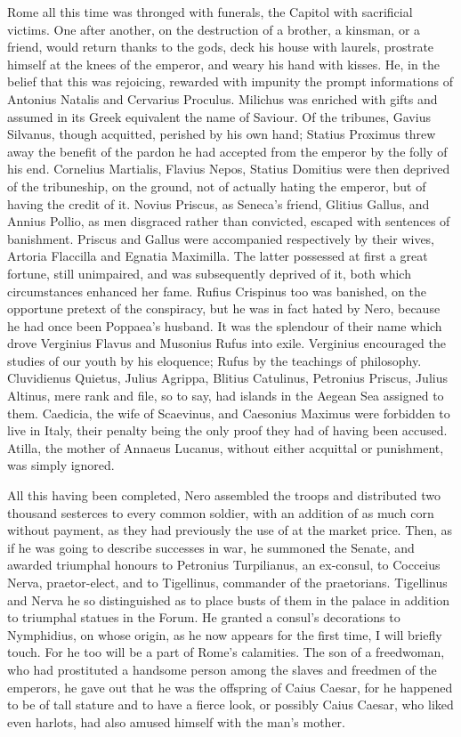 Rome all this time was thronged with funerals, the Capitol with sacrificial victims. One after another, on the destruction of a brother, a kinsman, or a friend, would return thanks to the gods, deck his house with laurels, prostrate himself at the knees of the emperor, and weary his hand with kisses. He, in the belief that this was rejoicing, rewarded with impunity the prompt informations of Antonius Natalis and Cervarius Proculus. Milichus was enriched with gifts and assumed in its Greek equivalent the name of Saviour. Of the tribunes, Gavius Silvanus, though acquitted, perished by his own hand; Statius Proximus threw away the benefit of the pardon he had accepted from the emperor by the folly of his end. Cornelius Martialis, Flavius Nepos, Statius Domitius were then deprived of the tribuneship, on the ground, not of actually hating the emperor, but of having the credit of it. Novius Priscus, as Seneca's friend, Glitius Gallus, and Annius Pollio, as men disgraced rather than convicted, escaped with sentences of banishment. Priscus and Gallus were accompanied respectively by their wives, Artoria Flaccilla and Egnatia Maximilla. The latter possessed at first a great fortune, still unimpaired, and was subsequently deprived of it, both which circumstances enhanced her fame. Rufius Crispinus too was banished, on the opportune pretext of the conspiracy, but he was in fact hated by Nero, because he had once been Poppaea's husband. It was the splendour of their name which drove Verginius Flavus and Musonius Rufus into exile. Verginius encouraged the studies of our youth by his eloquence; Rufus by the teachings of philosophy. Cluvidienus Quietus, Julius Agrippa, Blitius Catulinus, Petronius Priscus, Julius Altinus, mere rank and file, so to say, had islands in the Aegean Sea assigned to them. Caedicia, the wife of Scaevinus, and Caesonius Maximus were forbidden to live in Italy, their penalty being the only proof they had of having been accused. Atilla, the mother of Annaeus Lucanus, without either acquittal or punishment, was simply ignored.


All this having been completed, Nero assembled the troops and distributed two thousand sesterces to every common soldier, with an addition of as much corn without payment, as they had previously the use of at the market price. Then, as if he was going to describe successes in war, he summoned the Senate, and awarded triumphal honours to Petronius Turpilianus, an ex-consul, to Cocceius Nerva, praetor-elect, and to Tigellinus, commander of the praetorians. Tigellinus and Nerva he so distinguished as to place busts of them in the palace in addition to triumphal statues in the Forum. He granted a consul's decorations to Nymphidius, on whose origin, as he now appears for the first time, I will briefly touch. For he too will be a part of Rome's calamities. The son of a freedwoman, who had prostituted a handsome person among the slaves and freedmen of the emperors, he gave out that he was the offspring of Caius Caesar, for he happened to be of tall stature and to have a fierce look, or possibly Caius Caesar, who liked even harlots, had also amused himself with the man's mother.

